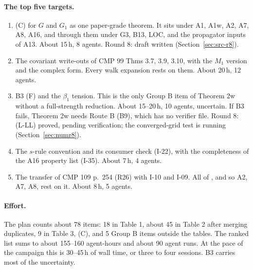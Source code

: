 \paragraph{The top five targets.}
\begin{enumerate}
\item (C) for $G$ and $G_1$ as one paper-grade theorem. It sits under A1, A1w, A2, A7, A8, A16, and through them under G3, B13, LOC, and the propagator inputs of A13. About 15\,h, 8 agents. Round 8: draft written (Section~\ref{sec:src-r8}).
\item The covariant write-outs of CMP 99 Thms 3.7, 3.9, 3.10, with the $M_1$ version and the complex form. Every walk expansion rests on them. About 20\,h, 12 agents.
\item B3 (F) and the $\beta_1$ tension. This is the only Group B item of Theorem 2w without a full-strength reduction. About 15--20\,h, 10 agents, uncertain. If B3 fails, Theorem 2w needs Route B (B9), which has no verifier file. Round 8: (L-LL) proved, pending verification; the converged-grid test is running (Section~\ref{sec:numr8}).
\item The $s$-rule convention and its consumer check (I-22), with the completeness of the A16 property list (I-35). About 7\,h, 4 agents.
\item The transfer of CMP 109 p.~254 (R26) with I-10 and I-09. All of , and so A2, A7, A8, rest on it. About 8\,h, 5 agents.
\end{enumerate}

\paragraph{Effort.} The plan counts about 78 items: 18 in Table 1, about 45 in Table 2 after merging duplicates, 9 in Table 3, (C), and 5 Group B items outside the tables. The ranked list sums to about 155--160 agent-hours and about 90 agent runs. At the pace of the campaign this is 30--45\,h of wall time, or three to four sessions. B3 carries most of the uncertainty.

